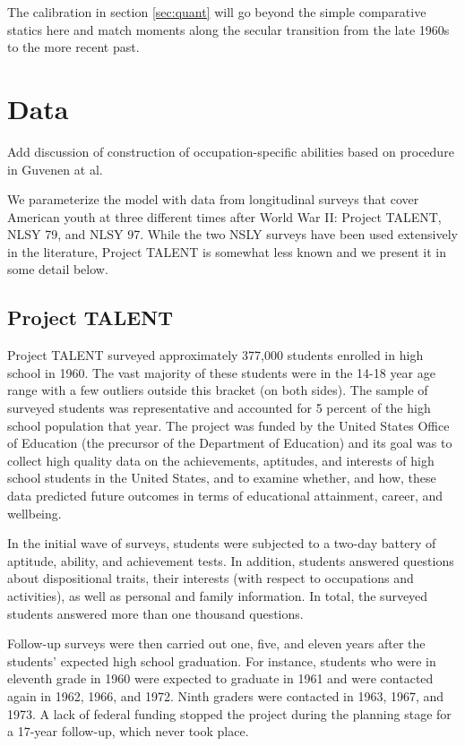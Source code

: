 \documentclass[onehalfspacing,11pt]{article}
\begin{document}
The calibration in section \ref{sec:quant} will go beyond the simple comparative statics here and match moments along the secular transition from the late 1960s to the more recent past.

\section{Data}\label{sec:data}

{\sc Add discussion of construction of occupation-specific abilities based on procedure in Guvenen at al.}

We parameterize the model with data from longitudinal surveys that cover American youth at three different times after World War II: Project TALENT, NLSY 79, and NLSY 97. While the two NSLY surveys have been used extensively in the literature, Project TALENT is somewhat less known and we present it in some detail below.
\subsection{Project TALENT}

Project TALENT surveyed approximately 377,000 students enrolled in high school in 1960. The vast majority of these students were in the 14-18 year age range with a few outliers outside this bracket (on both sides). The sample of surveyed students was representative and accounted for 5 percent of the high school population that year. The project was funded by the United States Office of Education (the precursor of the Department of Education) and its goal was to collect high quality data on the achievements, aptitudes, and interests of high school students in the United States, and to examine whether, and how, these data predicted future outcomes in terms of educational attainment, career, and wellbeing.

In the initial wave of surveys, students were subjected to a two-day battery of aptitude, ability, and achievement tests. In addition, students answered questions about dispositional traits, their interests (with respect to occupations and activities), as well as personal and family information. 	In total, the surveyed students answered more than one thousand questions.

Follow-up surveys were then carried out one, five, and eleven years after the students' expected high school graduation. For instance, students who were in eleventh grade in 1960 were expected to graduate in 1961 and were contacted again in 1962, 1966, and 1972. Ninth graders were contacted in 1963, 1967, and 1973. A lack of federal funding stopped the project during the planning stage for a 17-year follow-up, which never took place.
\end{document}
